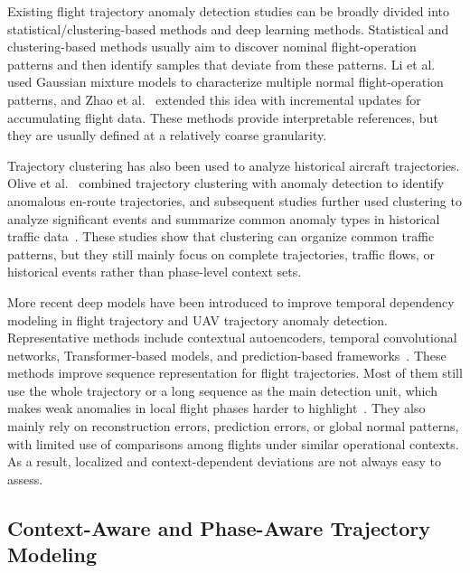 \documentclass[iicol,pdflatex,sn-basic,Numbered]{sn-jnl}%
\theoremstyle{thmstyleone}%
\theoremstyle{thmstyletwo}%
\theoremstyle{thmstylethree}%
\begin{document}
Existing flight trajectory anomaly detection studies can be broadly divided into statistical/clustering-based methods and deep learning methods.
Statistical and clustering-based methods usually aim to discover nominal flight-operation patterns and then identify samples that deviate from these patterns.
Li et al.~\cite{li2016gmm} used Gaussian mixture models to characterize multiple normal flight-operation patterns, and Zhao et al.~\cite{zhao2021incremental} extended this idea with incremental updates for accumulating flight data. 
These methods provide interpretable references, but they are usually defined at a relatively coarse granularity.

Trajectory clustering has also been used to analyze historical aircraft trajectories.
Olive et al.~\cite{olive:hal-02345597,olive2020significant} combined trajectory clustering with anomaly detection to identify anomalous en-route trajectories, and subsequent studies further used clustering to analyze significant events and summarize common anomaly types in historical traffic data~\cite{aerospace13030209}. 
These studies show that clustering can organize common traffic patterns, but they still mainly focus on complete trajectories, traffic flows, or historical events rather than phase-level context sets.

More recent deep models have been introduced to improve temporal dependency modeling in flight trajectory and UAV trajectory anomaly detection.
Representative methods include contextual autoencoders, temporal convolutional networks, Transformer-based models, and prediction-based frameworks~\cite{chevrot2022cae,LUO2024103840,HUANG2025103478}.
These methods improve sequence representation for flight trajectories.
Most of them still use the whole trajectory or a long sequence as the main detection unit, which makes weak anomalies in local flight phases harder to highlight~\cite{lee2008trajectory,laxhammar2012online,yang2013trasmil}. 
They also mainly rely on reconstruction errors, prediction errors, or global normal patterns, with limited use of comparisons among flights under similar operational contexts.
As a result, localized and context-dependent deviations are not always easy to assess.

\subsection{Context-Aware and Phase-Aware Trajectory Modeling}
\end{document}
